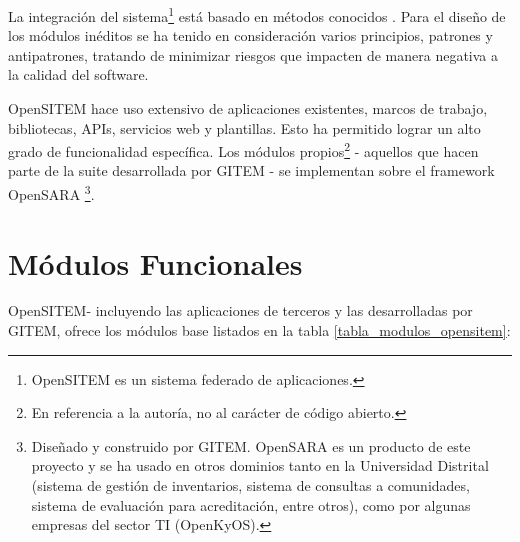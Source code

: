 La integración del sistema\footnote{OpenSITEM es un sistema federado de aplicaciones.} está basado en métodos conocidos \cite{balduino2010}. Para el diseño de los módulos inéditos se ha tenido en consideración varios principios, patrones y antipatrones, tratando de minimizar riesgos que impacten de manera negativa a la calidad del software.

OpenSITEM hace uso extensivo de aplicaciones existentes, marcos de trabajo, bibliotecas, APIs, servicios web y plantillas. Esto ha permitido lograr un alto grado de funcionalidad específica. Los módulos propios\footnote{En referencia a la autoría, no al carácter de código abierto.} - aquellos que hacen parte de la suite desarrollada por GITEM - se implementan sobre el framework OpenSARA \footnote{Diseñado y construido por GITEM. OpenSARA es un producto de este proyecto y se ha usado en otros dominios tanto en la Universidad Distrital (sistema de gestión de inventarios, sistema de consultas a comunidades, sistema de evaluación para acreditación, entre otros), como por algunas empresas del sector TI (OpenKyOS).}.

\section{Módulos Funcionales}

OpenSITEM- incluyendo las aplicaciones de terceros y las desarrolladas por GITEM, ofrece los módulos base listados en la tabla \ref{tabla_modulos_opensitem}:

